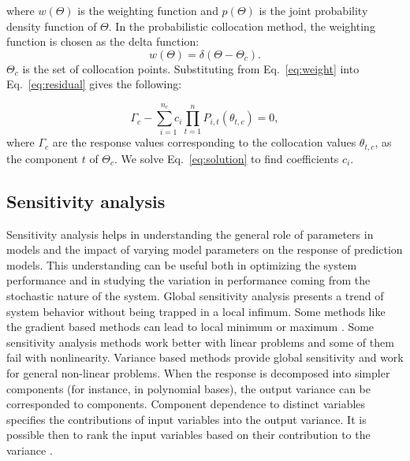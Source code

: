 where $w(\Theta)$ is the weighting function and $p(\Theta)$ is the joint
probability density function of $\Theta$. In the probabilistic collocation
method, the weighting function is chosen as the delta function:
\begin{equation}
 w(\Theta) = \delta(\Theta-\Theta_c). \label{eq:weight}
\end{equation}
$\Theta_c$ is the set of collocation points. Substituting from
Eq.~\ref{eq:weight} into Eq.~\ref{eq:residual} gives the following:

\begin{equation}
 \Gamma_{c}-\underset{i=1}{\overset{n_c}{\sum}c_{i}}\underset{t=1}{\overset{n}{
\prod}}P_{i,t}(\theta_{t,c})=0, \label{eq:solution}
\end{equation}
 where $\Gamma_c$ are the response values corresponding to the collocation
values $\theta_{t,c}$, as the component $t$ of $\Theta_{c}$. We solve
Eq.~\ref{eq:solution} to find coefficients $c_i$.

\subsection{Sensitivity analysis}
\label{Section:SA}
Sensitivity analysis helps in understanding the general role of parameters in
models and the impact of varying model parameters on the response of prediction
models. This understanding can be useful both in optimizing the system
performance and in studying the variation in performance coming from the
stochastic nature of the system. Global sensitivity analysis presents a trend of
system behavior without being trapped in a local infimum. Some methods like the
gradient based methods can lead to local minimum or maximum
\cite{saltelli2007global}. Some sensitivity analysis methods work better with
linear problems and some of them fail with nonlinearity. Variance based methods
provide global sensitivity and work for general non-linear problems. When the
response is decomposed into simpler components (for instance, in polynomial
bases), the output variance can be corresponded to components. Component
dependence to distinct variables specifies the contributions of input variables
into the output variance. It is 
possible then to rank the input variables based on their contribution to the
variance \cite{saltelli2007global,reuter2008global}.

